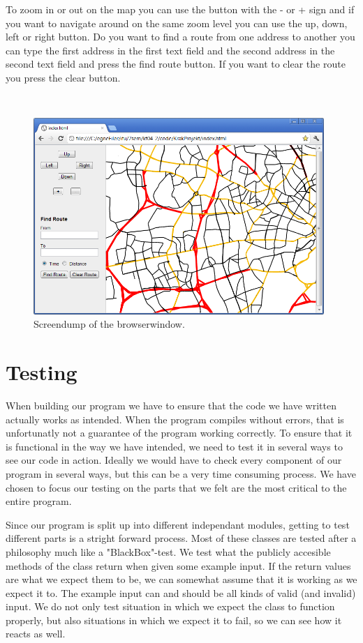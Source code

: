 \documentclass[a4paper,10pt,titlepage]{article}
\begin{document}
		To zoom in or out on the map you can use the button with the - or + sign and if you want to navigate around on the same zoom level you can use the up, down, left or right button. Do you want to find a route from one address to another you can type the first address in the first text field and the second address in the second text field and press the find route button. If you want to clear the route you press the clear button.

		 \mbox{}\\
		
		\begin{figure}[H]
\includegraphics[width=110mm]{screendump.png}
\caption{Screendump of the browserwindow.}
\label{fig:screendump}
\end{figure}
		
		
	\newpage
	\section{Testing}
	When building our program we have to ensure that the code we have written actually works as intended. When the program compiles without errors, that is unfortunatly not a guarantee of the program working correctly. To ensure that it is functional in the way we have intended, we need to test it in several ways to see our code in action. Ideally we would have to check every component of our program in several ways, but this can be a very time consuming process. We have chosen to focus our testing on the parts that we felt are the most critical to the entire program.

Since our program is split up into different independant modules, getting to test different parts is a stright forward process. Most of these classes are tested after a philosophy much like a "BlackBox"-test. We test what the publicly accesible methods of the class return when given some example input. If the return values are what we expect them to be, we can somewhat assume that it is working as we expect it to. The example input can and should be all kinds of valid (and invalid) input. We do not only test situation in which we expect the class to function properly, but also situations in which we expect it to fail, so we can see how it reacts as well.
\end{document}
